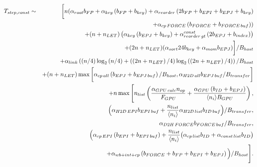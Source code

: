 \documentclass[dvipdfmx]{pasj01}
\begin{document}
\begin{eqnarray}
  T_{\rm step, const} &\sim&  \bigg[ n ( \alpha_{\rm root} b_{\rm FP}
    + \alpha_{\rm key} \left( b_{\rm FP} + b_{\rm key} \right) 
    + \alpha_{\rm reorder} \left( 2b_{\rm FP} + b_{\rm EPI} + b_{\rm EPJ} + b_{\rm key} \right) \nonumber \\
    && + \alpha_{\rm cp\, FORCE} \left( b_{\rm FORCE} + b_{\rm FORCE\, buf} \right)  ) \nonumber  \\
    && + (n+n_{\rm LET}) \left( \alpha_{\rm key} \left( b_{\rm EPJ} + b_{\rm key} \right)
    + \alpha^{\rm const}_{\rm reorder\, gt} \left( 2b_{\rm EPJ} + b_{\rm index} \right) \right) \nonumber  \\
    && + (2n+n_{\rm LET})(\alpha_{\rm sort} 24 b_{\rm key} + \alpha_{\rm mom} b_{\rm EPJ} ) \bigg] / B_{\rm host} \nonumber \\
  && + \alpha_{\rm link} \left( \left( n/4 \right) \log_2\left( n/4\right) + \left( \left(2n+n_{\rm LET}\right)/4 \right) \log_2\left( \left(2n+n_{\rm LET}\right)/4\right) \right) / B_{\rm host} \nonumber \\
  && + (n+n_{\rm LET}) \max \bigg[ \alpha_{\rm cp\, all} \left( b_{\rm EPJ} + b_{\rm EPJ\, buf}\right) / B_{\rm host}, \alpha_{\rm H2D\, all} b_{\rm EPJ\, buf} / B_{\rm transfer} \bigg] \nonumber  \\
  && + n \max \Bigg[ n_{\rm list} \left( \frac{\alpha_{\rm GPU\, calc} n_{\rm op}}{F_{\rm GPU}} + \frac{\alpha_{\rm GPU} \left( b_{\rm ID} + b_{\rm EPJ} \right) }{\langle n_i \rangle B_{\rm GPU}}\right), \nonumber \\
    && \Big (\alpha_{\rm H2D\, EPI} b_{\rm EPI\, buf}
    +  \frac{n_{\rm list}}{\langle n_{\rm i}\rangle} \alpha_{\rm H2D\, list} b_{\rm ID\, buf} \Big) / B_{\rm transfer}, \nonumber  \\
    && \alpha_{\rm D2H\, FORCE} b_{\rm FORCE\, buf} / B_{\rm transfer}, \nonumber \\
    && \Big( \alpha_{\rm cp\, EPI} \left(b_{\rm EPI} + b_{\rm EPI\, buf} \right)
    +  \frac{n_{\rm list}}{\langle n_{\rm i}\rangle} 
    \big( \alpha_{\rm cp\, list} b_{\rm ID} + \alpha_{\rm const\, list} b_{\rm ID} \big) \nonumber \\ 
    && + \alpha_{\rm wb+int+cp} \left( b_{\rm FORCE} + b_{\rm FP} + b_{\rm EPI} + b_{EPJ} \right)   \Big) / B_{\rm host} \Bigg].
  \label{eq:total_const}
\end{eqnarray}
\end{document}
